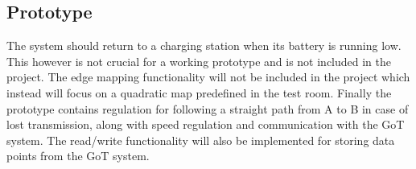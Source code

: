 \subsection{Prototype}
The system should return to a charging station when its battery is running low. This however is not crucial for a working prototype and is not included in the project.
The edge mapping functionality will not be included in the project which instead will focus on a quadratic map predefined in the test room.
Finally the prototype contains regulation for following a straight path from A to B in case of lost transmission, along with speed regulation and communication with the GoT system. The read/write functionality will also be implemented for storing data points from the GoT system.

